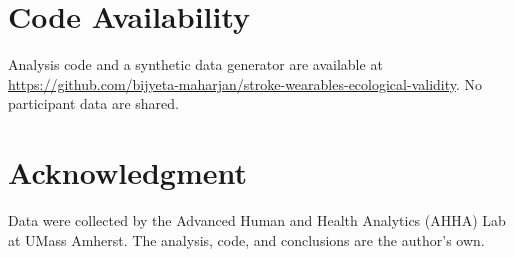 \documentclass[conference]{IEEEtran}
\begin{document}
\section*{Code Availability}

Analysis code and a synthetic data generator are available at
\url{https://github.com/bijyeta-maharjan/stroke-wearables-ecological-validity}.
No participant data are shared.

\section*{Acknowledgment}

Data were collected by the Advanced Human and Health Analytics (AHHA) Lab at
UMass Amherst. The analysis, code, and conclusions are the author's own.
\end{document}
